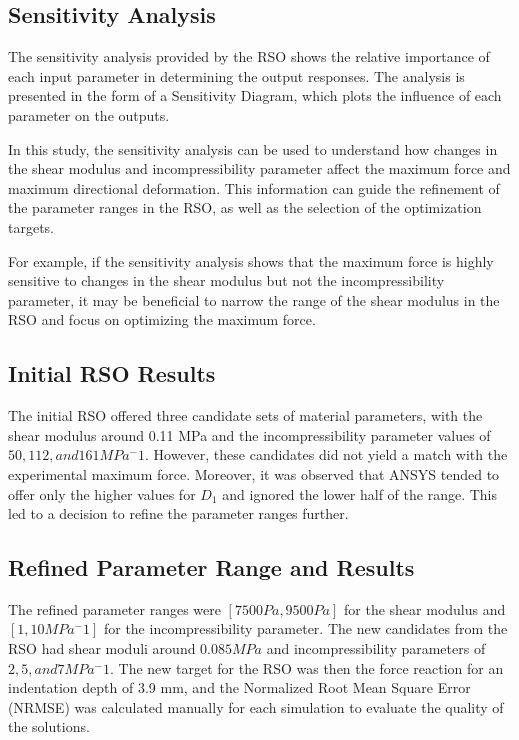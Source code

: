  



\subsection{Sensitivity Analysis}

The sensitivity analysis provided by the RSO shows the relative importance of each input parameter in determining the output responses. The analysis is presented in the form of a Sensitivity Diagram, which plots the influence of each parameter on the outputs.

In this study, the sensitivity analysis can be used to understand how changes in the shear modulus and incompressibility parameter affect the maximum force and maximum directional deformation. This information can guide the refinement of the parameter ranges in the RSO, as well as the selection of the optimization targets.

For example, if the sensitivity analysis shows that the maximum force is highly sensitive to changes in the shear modulus but not the incompressibility parameter, it may be beneficial to narrow the range of the shear modulus in the RSO and focus on optimizing the maximum force.


\subsection{Initial RSO Results}

The initial RSO offered three candidate sets of material parameters, with the shear modulus around 0.11 MPa and the incompressibility parameter values of $50, 112, and 161 MPa^-1$. However, these candidates did not yield a match with the experimental maximum force. Moreover, it was observed that ANSYS tended to offer only the higher values for $D_1$ and ignored the lower half of the range. This led to a decision to refine the parameter ranges further.

\subsection{Refined Parameter Range and Results}

The refined parameter ranges were $[7500 Pa, 9500 Pa]$ for the shear modulus and $[1, 10 MPa^-1]$ for the incompressibility parameter. The new candidates from the RSO had shear moduli around $0.085 MPa$ and incompressibility parameters of $2, 5, and 7 MPa^-1$. The new target for the RSO was then the force reaction for an indentation depth of 3.9 mm, and the Normalized Root Mean Square Error (NRMSE) was calculated manually for each simulation to evaluate the quality of the solutions.

